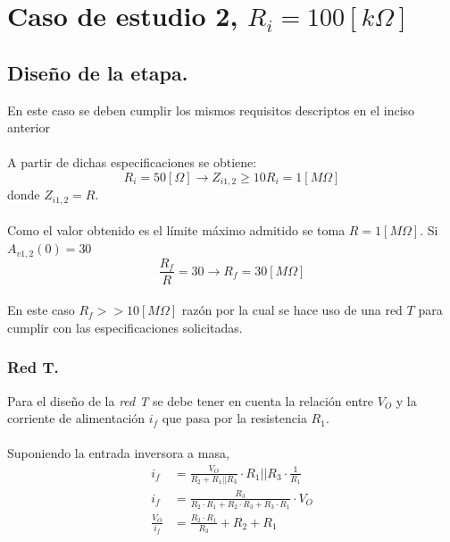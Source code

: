 \newpage

\section{Caso de estudio 2, $R_i=100[k\Omega]$}

\subsection{Diseño de la etapa.}
\onehalfspacing
En este caso se deben cumplir los mismos requisitos descriptos en el inciso anterior
\paragraph{}
A partir de dichas especificaciones se obtiene:
\begin{equation}
    \nonumber
    R_i=50[\Omega] \longrightarrow Z_{i1,2} \geq 10R_i = 1[M\Omega]
\end{equation}
donde $Z_{i1,2} = R$.
\paragraph{}
Como el valor obtenido es el límite máximo admitido se toma $R=1[M\Omega]$. Si $A_{v1,2}(0)=30$
\begin{equation}
    \nonumber
    \frac{R_f}{R}=30 \longrightarrow R_f=30[M\Omega]
\end{equation}
\paragraph{}
En este caso $R_f >> 10[M\Omega]$ razón por la cual se hace uso de una red $T$ para cumplir con las especificaciones solicitadas.

\subsubsection{Red T.}
\onehalfspacing
Para el diseño de la \textit{red T} se debe tener en cuenta la relación entre $V_O$ y la corriente de alimentación $i_f$ que pasa por la resistencia $R_1$.
\paragraph{}
Suponiendo la entrada inversora a masa,
\begin{align}
    \nonumber
    i_f &= \frac{V_O}{R_2 + R_1||R_3}\cdot R_1||R_3 \cdot \frac{1}{R_1} \\
    \nonumber
    i_f &= \frac{R_3}{R_2\cdot R_1 + R_2\cdot R_3 + R_3\cdot R_1} \cdot V_O \\
    \nonumber
    \frac{V_O}{i_f} &= \frac{R_2 \cdot R_1}{R_3} + R_2 + R_1
\end{align}

